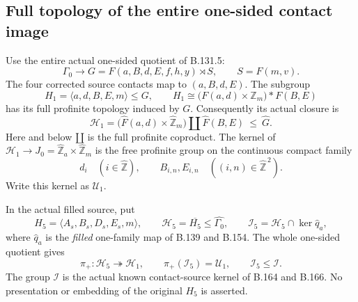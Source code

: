 \subsection*{Full topology of the entire one-sided contact image}
\label{stmt:B169}
Use the entire actual one-sided quotient of B.131.5:
\[
 \Gamma_0\longrightarrow
 G=F(a,B,d,E,f,h,y)\rtimes S,\qquad S=F(m,v).
\]
The four corrected source contacts map to \((a,B,d,E)\).
The subgroup
\[
 H_1=\langle a,d,B,E,m\rangle\le G,\qquad
 H_1\cong\bigl(F(a,d)\times\mathbb Z_m\bigr)*F(B,E)
\]
has its full profinite topology induced by \(G\). Consequently its
actual closure is
\begin{equation}\label{eq:B169-image-completion}
 \mathcal H_1=
   \bigl(\widehat F(a,d)\times\widehat{\mathbb Z}_m\bigr)
       \amalg\widehat F(B,E)\ \le\ \widehat G.
\end{equation}
Here and below \(\amalg\) is the full profinite coproduct.
The kernel of \(\mathcal H_1\to
J_0=\widehat{\mathbb Z}_a\times\widehat{\mathbb Z}_m\)
is the free profinite group on the continuous compact family
\begin{equation}\label{eq:B169-compact-labels}
 d_i\quad(i\in\widehat{\mathbb Z}),\qquad
 B_{i,n},E_{i,n}\quad((i,n)\in\widehat{\mathbb Z}^{\,2}).
\end{equation}
Write this kernel as \(\mathcal U_1\).

In the actual filled source, put
\[
 H_5=\langle A_s,B_s,D_s,E_s,m\rangle,\qquad
 \mathcal H_5=\overline{H_5}\le\widehat{\Gamma_0},\qquad
 \mathcal I_5=\mathcal H_5\cap\ker\widehat q_a,
\]
where \(\widehat q_a\) is the \emph{filled} one-family map of
B.139 and B.154. The whole one-sided quotient gives
\begin{equation}\label{eq:B169-source-triangle}
 \pi_+:\mathcal H_5\twoheadrightarrow\mathcal H_1,\qquad
 \pi_+(\mathcal I_5)=\mathcal U_1,\qquad
 \mathcal I_5\le\mathcal I.
\end{equation}
The group \(\mathcal I\) is the actual known contact-source kernel of
B.164 and B.166. No presentation or embedding of the original
\(H_5\) is asserted.

